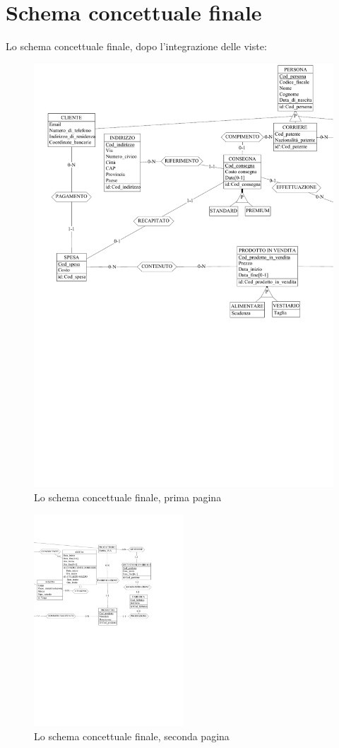 \documentclass[a4paper,12pt]{report}
\begin{document}
\section{Schema concettuale finale}
Lo schema concettuale finale, dopo l'integrazione delle viste:
\begin{figure}[h]
	\centering{}
	\includegraphics[width=\textwidth]{img/SchemaConcettuale-fin1.pdf}
	\caption{Lo schema concettuale finale, prima pagina}
\end{figure}
\begin{figure}[h]
	\centering{}
	\includegraphics[width=0.50\textwidth]{img/SchemaConcettuale-fin2.pdf}
	\caption{Lo schema concettuale finale, seconda pagina}
\end{figure}
\end{document}
